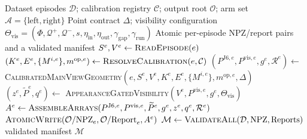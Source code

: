 \begin{algorithm}[t]
\caption{End-to-End Geometry-Guided Visibility-Aware Label Generation}
\label{alg:eef-labeling}
\begin{algorithmic}[1]
\Require Dataset episodes $\mathcal{D}$; calibration registry $\mathcal{C}$;
output root $\mathcal{O}$; arm set $\mathcal{A}=\{\mathrm{left},\mathrm{right}\}$
\Require Point contract $\Delta$; visibility configuration
$\Theta_{\mathrm{vis}}=(\Phi,\mathcal{Q}^{+},\mathcal{Q}^{-},s,
\eta_{\mathrm{in}},\eta_{\mathrm{out}},\gamma_{\mathrm{gap}},
\gamma_{\mathrm{run}})$
\Ensure Atomic per-episode NPZ/report pairs and a validated manifest
    \State $S^e,V^e\gets\textsc{ReadEpisode}(e)$
    \State $(K^e,E^e,\{M^{i,e}\},m^{\mathrm{op},e})\gets
    \textsc{ResolveCalibration}(e,\mathcal{C})$
    \State $(P^{\mathrm{J6},e},P^{\mathrm{vis},e},g^e,\mathcal{R}^e)\gets$
    \textsc{CalibratedMainViewGeometry}$(e,S^e,V^e,K^e,E^e,
    \{M^{i,e}\},m^{\mathrm{op},e},\Delta)$
    \State $(z^e,\widetilde P^e,q^e)\gets$
    \textsc{AppearanceGatedVisibility}$(V^e,P^{\mathrm{vis},e},g^e,
    \Theta_{\mathrm{vis}})$
    \State $A^e\gets\textsc{AssembleArrays}(P^{\mathrm{J6},e},P^{\mathrm{vis},e},
    \widetilde P^e,g^e,z^e,q^e,\mathcal{R}^e)$
    \State $\textsc{AtomicWrite}(\mathcal{O}/\mathrm{NPZ}_e,
    \mathcal{O}/\mathrm{Report}_e,A^e)$
\EndFor
\State $\mathcal{M}\gets
\textsc{ValidateAll}(\mathcal{D},\mathrm{NPZ},\mathrm{Reports})$
\State \Return validated manifest $\mathcal{M}$
\end{algorithmic}
\end{algorithm}
